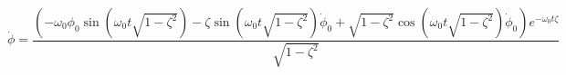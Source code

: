 \begin{equation}
\dot{\phi} = \frac{\left(- \omega_{0} \phi_{0} \operatorname{sin}\left(\omega_{0} t \sqrt{1 - \zeta^{2}}\right) - \zeta \operatorname{sin}\left(\omega_{0} t \sqrt{1 - \zeta^{2}}\right) \dot{\phi}_{0} + \sqrt{1 - \zeta^{2}} \operatorname{cos}\left(\omega_{0} t \sqrt{1 - \zeta^{2}}\right) \dot{\phi}_{0}\right) e^{- \omega_{0} t \zeta}}{\sqrt{1 - \zeta^{2}}}
\end{equation}

